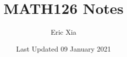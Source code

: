 \documentclass{article}
\title{MATH126 Notes}
\author{Eric Xia}
\date{Last Updated 09 January 2021}
\begin{document}
    \maketitle
    \tableofcontents
    \pagebreak


\end{document}
